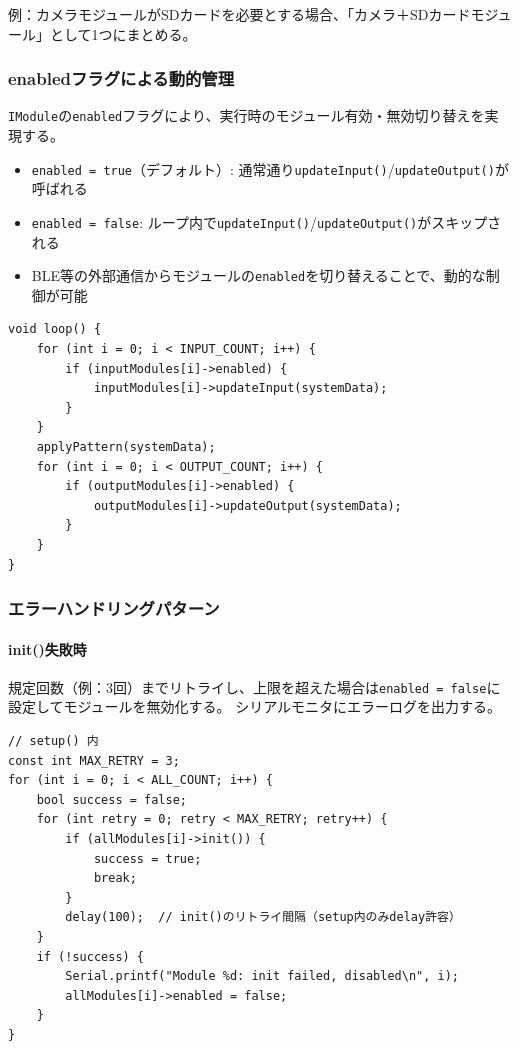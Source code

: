 例：カメラモジュールがSDカードを必要とする場合、「カメラ＋SDカードモジュール」として1つにまとめる。

\subsubsection{enabledフラグによる動的管理}

\texttt{IModule}の\texttt{enabled}フラグにより、実行時のモジュール有効・無効切り替えを実現する。

\begin{itemize}
    \item \texttt{enabled = true}（デフォルト）: 通常通り\texttt{updateInput()}/\texttt{updateOutput()}が呼ばれる
    \item \texttt{enabled = false}: ループ内で\texttt{updateInput()}/\texttt{updateOutput()}がスキップされる
    \item BLE等の外部通信からモジュールの\texttt{enabled}を切り替えることで、動的な制御が可能
\end{itemize}

\begin{lstlisting}[style=cppstyle, caption={enabledフラグの使用例}]
void loop() {
    for (int i = 0; i < INPUT_COUNT; i++) {
        if (inputModules[i]->enabled) {
            inputModules[i]->updateInput(systemData);
        }
    }
    applyPattern(systemData);
    for (int i = 0; i < OUTPUT_COUNT; i++) {
        if (outputModules[i]->enabled) {
            outputModules[i]->updateOutput(systemData);
        }
    }
}
\end{lstlisting}

\subsubsection{エラーハンドリングパターン}

\paragraph{init()失敗時}
規定回数（例：3回）までリトライし、上限を超えた場合は\texttt{enabled = false}に設定してモジュールを無効化する。
シリアルモニタにエラーログを出力する。

\begin{lstlisting}[style=cppstyle, caption={init()リトライパターンの実装例}]
// setup() 内
const int MAX_RETRY = 3;
for (int i = 0; i < ALL_COUNT; i++) {
    bool success = false;
    for (int retry = 0; retry < MAX_RETRY; retry++) {
        if (allModules[i]->init()) {
            success = true;
            break;
        }
        delay(100);  // init()のリトライ間隔（setup内のみdelay許容）
    }
    if (!success) {
        Serial.printf("Module %d: init failed, disabled\n", i);
        allModules[i]->enabled = false;
    }
}
\end{lstlisting}

